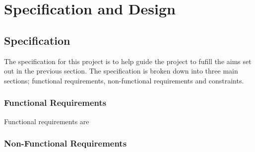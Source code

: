 \documentclass[12pt, conference, final, a4paper, onecolumn, compsoc]{IEEEtran}
\begin{document}

\subsection*{} %


\subsection*{} %


\subsection*{} %


\section{Specification and Design}

\subsection*{Specification}

The specification for this project is to help guide the project to fufill the
aims set out in the previous section. The specification is broken down into
three main sections; functional requirements, non-functional requirements and
constraints.

\subsubsection*{Functional Requirements}

Functional requirements are




\subsubsection*{Non-Functional Requirements}
\end{document}
